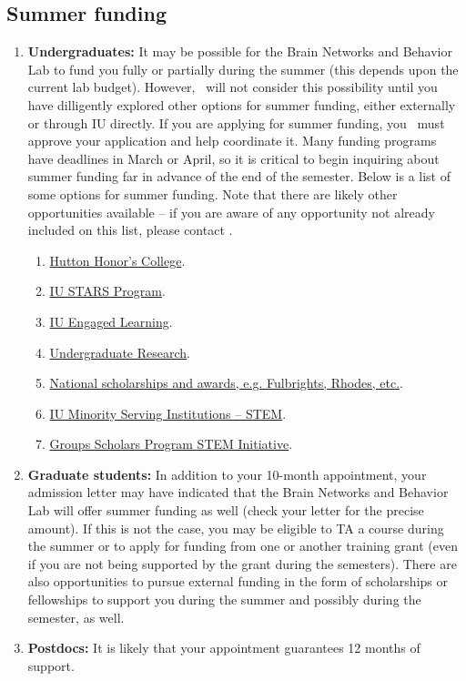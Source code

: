 \documentclass{tufte-book} %
\begin{document}
\subsection{Summer funding}
\begin{enumerate}
\item \textbf{Undergraduates:} It may be possible for the Brain Networks and Behavior Lab to fund you fully or partially during the summer (this depends upon the current lab budget). However, \director~will not consider this possibility until you have dilligently explored other options for summer funding, either externally or through IU directly. If you are applying for summer funding, you \director~must approve your application and help coordinate it. Many funding programs have deadlines in March or April, so it is critical to begin inquiring about summer funding far in advance of the end of the semester. Below is a list of some options for summer funding. Note that there are likely other opportunities available -- if you are aware of any opportunity not already included on this list, please contact \director.

\begin{enumerate}
\item \href{https://hutton.indiana.edu/funding/index.html}{Hutton Honor's College}.
\item \href{https://college.indiana.edu/research/undergraduate-research/stars/index.html}{IU STARS Program}.
\item \href{https://engagedlearning.indiana.edu}{IU Engaged Learning}.
\item \href{https://undergradresearch.indiana.edu/index.html}{Undergraduate Research}.
\item \href{https://nsa.indiana.edu}{National scholarships and awards, e.g. Fulbrights, Rhodes, etc.}.
\item \href{http://www.stem.indiana.edu}{IU Minority Serving Institutions -- STEM}.
\item \href{http://www.indiana.edu/~groups/stem/index.html}{Groups Scholars Program STEM Initiative}.
\end{enumerate}

\item \textbf{Graduate students:} In addition to your 10-month appointment, your admission letter may have indicated that the Brain Networks and Behavior Lab will offer summer funding as well (check your letter for the precise amount). If this is not the case, you may be eligible to TA a course during the summer or to apply for funding from one or another training grant (even if you are not being supported by the grant during the semesters). There are also opportunities to pursue external funding in the form of scholarships or fellowships to support you during the summer and possibly during the semester, as well.

\item \textbf{Postdocs:} It is likely that your appointment guarantees 12 months of support.
\end{enumerate}
\end{document}
